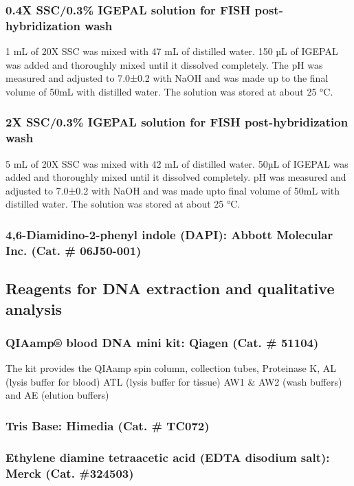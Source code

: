 \begin{refsection}
\subsubsection{0.4X SSC/0.3\% IGEPAL solution for FISH post-hybridization wash}
1 mL of 20X SSC was mixed with 47 mL of distilled water. 150 µL of IGEPAL was added and thoroughly mixed until it dissolved completely. The pH was measured and adjusted to 7.0±0.2 with NaOH and was made up to the final volume of 50mL with distilled water. The solution was stored at about 25 °C.


\subsubsection{2X SSC/0.3\% IGEPAL solution for FISH post-hybridization wash}
5 mL of 20X SSC was mixed with 42 mL of distilled water. 50µL of IGEPAL was added and thoroughly mixed until it dissolved completely. pH was measured and adjusted to 7.0±0.2 with NaOH and was made upto final volume of 50mL with distilled water. The solution was stored at about 25 °C.
\subsubsection{4,6-Diamidino-2-phenyl indole (DAPI): \textmd{Abbott Molecular Inc. (Cat. \# 06J50-001)}}
\subsection{Reagents for  DNA extraction and qualitative analysis} 
\subsubsection{QIAamp® blood DNA mini kit: \textmd{Qiagen (Cat. \# 51104)}}
The kit provides the QIAamp spin column, collection tubes, Proteinase K, AL (lysis buffer for blood) ATL (lysis buffer for tissue) AW1 \& AW2 (wash buffers) and AE (elution buffers) 
\subsubsection{Tris Base: \textmd{Himedia (Cat. \# TC072)}}
\begin{sloppypar}\subsubsection{Ethylene diamine tetraacetic acid (EDTA disodium salt): \textmd{Merck (Cat. \#324503)}} \end{sloppypar}

\end{refsection}
